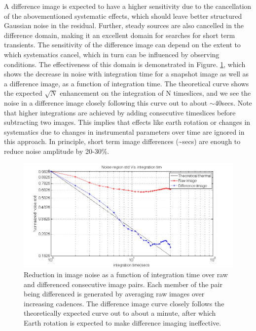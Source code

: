 \documentclass{aa}
\begin{document}
A difference image is expected to have a higher sensitivity due to
the cancellation of the abovementioned systematic effects, which should
leave better structured Gaussian noise in the residual. Further, steady
sources are also cancelled in the difference domain, making it an
excellent domain for searches for short term transients. The sensitivity
of the difference image can depend on the extent to which systematics
cancel, which in turn can be influenced by observing conditions. The
effectiveness of this domain is demonstrated in Figure. \ref{fig:Reduction-in-image},
which shows the decrease in noise with integration time for a snapshot
image as well as a difference image, as a function of integration
time. The theoretical curve shows the expected $\sqrt{N}$ enhancement
on the integration of N timeslices, and we see the noise in a difference
image closely following this curve out to about $\sim40$secs. Note
that higher integrations are achieved by adding consecutive timeslices
before subtracting two images. This implies that effects like earth
rotation or changes in systematics due to changes in instrumental
parameters over time are ignored in this approach. In principle, short
term image differences (\textasciitilde{}secs) are enough to reduce
noise amplitude by 20-30\%.

\begin{figure}[tbh]
\includegraphics[width=0.9\paperwidth]{Figs/raw_vs_diff_vs_theory}

\caption{\label{fig:Reduction-in-image}Reduction in image noise as a function
of integration time over raw and differenced consecutive image pairs.
Each member of the pair being differenced is generated by averaging
raw images over increasing cadences. The difference image curve closely
follows the theoretically expected curve out to about a minute, after
which Earth rotation is expected to make difference imaging ineffective.}
\end{figure}
\end{document}
